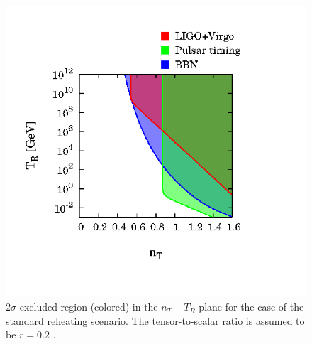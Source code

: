 \documentclass[11pt,a4paper,twoside]{book}
\begin{document}
\begin{figure}
	\centering
	\includegraphics[width=0.7\linewidth, height=0.3\textheight]{Images/Chap3/Kurojanagi_Takahashi_Fig3}
	\caption{$ 2\sigma $ excluded region (colored) in the $ n_{T}-T_{R} $ plane for the case of the standard reheating scenario. The tensor-to-scalar ratio is assumed to be $ r=0.2 $ \cite{Chap3:BlueTiltedSpectrum}.}
	\label{fig:kurojanagitakahashifig3}
\end{figure}
\end{document}
